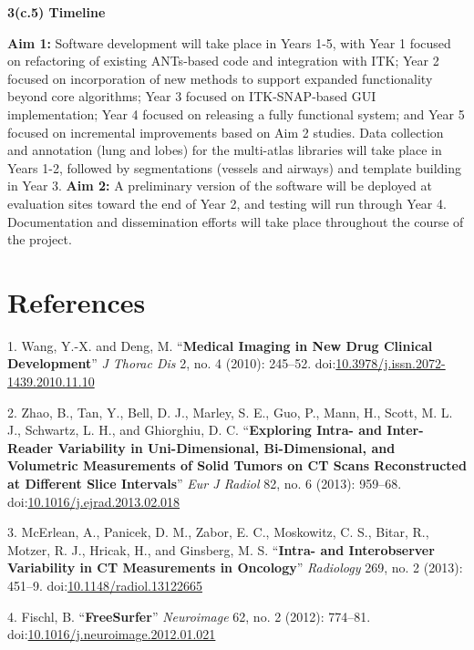 \documentclass[11pt,]{article}
\begin{document}
\textbf{3(c.5) Timeline}

\textbf{Aim 1:} Software development will take place in Years 1-5, with
Year 1 focused on refactoring of existing ANTs-based code and
integration with ITK; Year 2 focused on incorporation of new methods to
support expanded functionality beyond core algorithms; Year 3 focused on
ITK-SNAP-based GUI implementation; Year 4 focused on releasing a fully
functional system; and Year 5 focused on incremental improvements based
on Aim 2 studies. Data collection and annotation (lung and lobes) for
the multi-atlas libraries will take place in Years 1-2, followed by
segmentations (vessels and airways) and template building in Year 3.
\textbf{Aim 2:} A preliminary version of the software will be deployed
at evaluation sites toward the end of Year 2, and testing will run
through Year 4. Documentation and dissemination efforts will take place
throughout the course of the project.

\clearpage

\newpage

\section*{References}\label{references}

1. Wang, Y.-X. and Deng, M. ``\textbf{Medical Imaging in New Drug
Clinical Development}'' \emph{J Thorac Dis} 2, no. 4 (2010): 245--52.
doi:\href{http://dx.doi.org/10.3978/j.issn.2072-1439.2010.11.10}{10.3978/j.issn.2072-1439.2010.11.10}

2. Zhao, B., Tan, Y., Bell, D. J., Marley, S. E., Guo, P., Mann, H.,
Scott, M. L. J., Schwartz, L. H., and Ghiorghiu, D. C.
``\textbf{Exploring Intra- and Inter-Reader Variability in
Uni-Dimensional, Bi-Dimensional, and Volumetric Measurements of Solid
Tumors on CT Scans Reconstructed at Different Slice Intervals}''
\emph{Eur J Radiol} 82, no. 6 (2013): 959--68.
doi:\href{http://dx.doi.org/10.1016/j.ejrad.2013.02.018}{10.1016/j.ejrad.2013.02.018}

3. McErlean, A., Panicek, D. M., Zabor, E. C., Moskowitz, C. S., Bitar,
R., Motzer, R. J., Hricak, H., and Ginsberg, M. S. ``\textbf{Intra- and
Interobserver Variability in CT Measurements in Oncology}''
\emph{Radiology} 269, no. 2 (2013): 451--9.
doi:\href{http://dx.doi.org/10.1148/radiol.13122665}{10.1148/radiol.13122665}

4. Fischl, B. ``\textbf{FreeSurfer}'' \emph{Neuroimage} 62, no. 2
(2012): 774--81.
doi:\href{http://dx.doi.org/10.1016/j.neuroimage.2012.01.021}{10.1016/j.neuroimage.2012.01.021}
\end{document}
